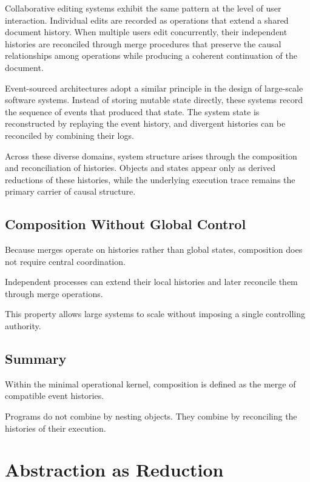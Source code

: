 \documentclass[12pt]{article}
\begin{document}
Collaborative editing systems exhibit the same pattern at
the level of user interaction. Individual edits are recorded
as operations that extend a shared document history. When
multiple users edit concurrently, their independent
histories are reconciled through merge procedures that
preserve the causal relationships among operations while
producing a coherent continuation of the document.

Event-sourced architectures adopt a similar principle in
the design of large-scale software systems. Instead of
storing mutable state directly, these systems record the
sequence of events that produced that state. The system
state is reconstructed by replaying the event history,
and divergent histories can be reconciled by combining
their logs.

Across these diverse domains, system structure arises
through the composition and reconciliation of histories.
Objects and states appear only as derived reductions of
these histories, while the underlying execution trace
remains the primary carrier of causal structure.

\subsection{Composition Without Global Control}

Because merges operate on histories rather than
global states, composition does not require
central coordination.

Independent processes can extend their local
histories and later reconcile them through
merge operations.

This property allows large systems to scale
without imposing a single controlling authority.

\subsection{Summary}

Within the minimal operational kernel,
composition is defined as the merge of compatible
event histories.

Programs do not combine by nesting objects.
They combine by reconciling the histories
of their execution.


\section{Abstraction as Reduction}
\end{document}
